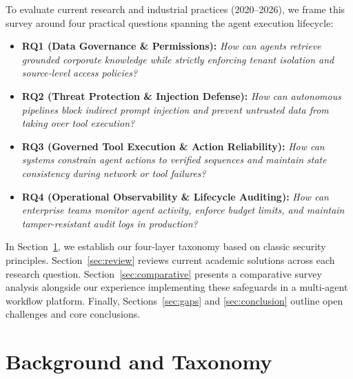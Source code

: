 \documentclass[sigconf]{acmart}
\begin{document}
To evaluate current research and industrial practices (2020--2026), we frame this survey around four practical questions spanning the agent execution lifecycle:
\begin{itemize}
  \item \textbf{RQ1 (Data Governance \& Permissions):} \emph{How can agents retrieve grounded corporate knowledge while strictly enforcing tenant isolation and source-level access policies?}
  \item \textbf{RQ2 (Threat Protection \& Injection Defense):} \emph{How can autonomous pipelines block indirect prompt injection and prevent untrusted data from taking over tool execution?}
  \item \textbf{RQ3 (Governed Tool Execution \& Action Reliability):} \emph{How can systems constrain agent actions to verified sequences and maintain state consistency during network or tool failures?}
  \item \textbf{RQ4 (Operational Observability \& Lifecycle Auditing):} \emph{How can enterprise teams monitor agent activity, enforce budget limits, and maintain tamper-resistant audit logs in production?}
\end{itemize}

In Section~\ref{sec:taxonomy}, we establish our four-layer taxonomy based on classic security principles. Section~\ref{sec:review} reviews current academic solutions across each research question. Section~\ref{sec:comparative} presents a comparative survey analysis alongside our experience implementing these safeguards in a multi-agent workflow platform. Finally, Sections~\ref{sec:gaps} and \ref{sec:conclusion} outline open challenges and core conclusions.

\section{Background and Taxonomy}
\label{sec:taxonomy}
\end{document}
